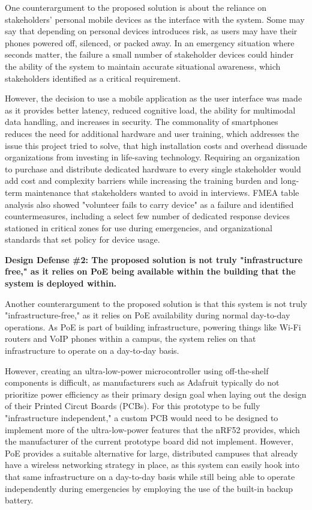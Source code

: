 \documentclass[english,12pt,a4paper,titlepage]{article}
\begin{document}
	
	One counterargument to the proposed solution is about the reliance on stakeholders' personal mobile devices as the  interface with the system. Some may say that depending on personal devices introduces risk, as users may have their phones powered off, silenced, or packed away. In an emergency situation where seconds matter, the failure a small number of stakeholder devices could hinder the ability of the system to maintain accurate situational awareness, which stakeholders identified as a critical requirement.
	
	However, the decision to use a mobile application as the user interface was made as it provides better latency, reduced cognitive load, the ability for multimodal data handling, and increases in security. The commonality of smartphones reduces the need for additional hardware and user training, which addresses the issue this project tried to solve, that high installation costs and overhead dissuade organizations from investing in life-saving technology. Requiring an organization to purchase and distribute dedicated hardware to every single stakeholder would add cost and complexity barriers while increasing the training burden and long-term maintenance that stakeholders wanted to avoid in interviews. FMEA table analysis also showed "volunteer fails to carry device" as a failure and identified countermeasures, including a select few number of dedicated response devices stationed in critical zones for use during emergencies, and organizational standards that set policy for device usage.
	
	\label{Design Defense - Two}
	\begin{flushleft}
		\bfseries{Design Defense \#2: The proposed solution is not truly "infrastructure free," as it relies on PoE being available within the building that the system is deployed within.}
	\end{flushleft}
	
	Another counterargument to the proposed solution is that this system is not truly "infrastructure-free," as it relies on PoE availability during normal day-to-day operations. As PoE is part of building infrastructure, powering things like Wi-Fi routers and VoIP phones within a campus, the system relies on that infrastructure to operate on a day-to-day basis.
	
	
	However, creating an ultra-low-power microcontroller using off-the-shelf components is difficult, as manufacturers such as Adafruit typically do not prioritize power efficiency as their primary design goal when laying out the design of their Printed Circut Boards (PCBs). For this prototype to be fully "infrastructure independent," a custom PCB would need to be designed to implement more of the ultra-low-power features that the nRF52 provides, which the manufacturer of the current prototype board did not implement. However, PoE provides a suitable alternative for large, distributed campuses that already have a wireless networking strategy in place, as this system can easily hook into that same infrastructure on a day-to-day basis while still being able to operate independently during emergencies by employing the use of the built-in backup battery.
	
\end{document}
